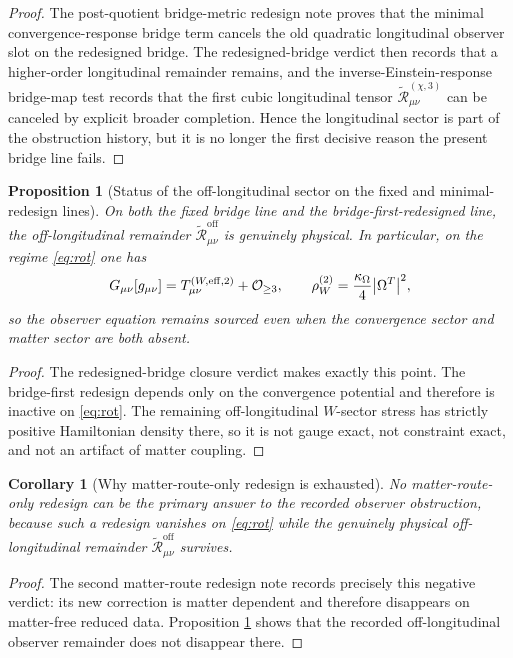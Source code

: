 \documentclass[11pt]{article}
\newcommand{\ObserverMetric}{g_{\mu\nu}}
\newcommand{\RemOff}{\widetilde{\mathcal R}_{\mu\nu}^{\mathrm{off}}}
\newcommand{\RemLongThree}{\widetilde{\mathcal R}_{\mu\nu}^{(\chi,3)}}
\newtheorem{proposition}{Proposition}
\newtheorem{corollary}{Corollary}
\begin{document}
\begin{proof}
The post-quotient bridge-metric redesign note proves that the minimal convergence-response bridge term cancels the old quadratic longitudinal observer slot on the redesigned bridge. The redesigned-bridge verdict then records that a higher-order longitudinal remainder remains, and the inverse-Einstein-response bridge-map test records that the first cubic longitudinal tensor \(\RemLongThree\) can be canceled by explicit broader completion. Hence the longitudinal sector is part of the obstruction history, but it is no longer the first decisive reason the present bridge line fails.
\end{proof}

\begin{proposition}[Status of the off-longitudinal sector on the fixed and minimal-redesign lines]
\label{prop:off}
On both the fixed bridge line and the bridge-first-redesigned line, the off-longitudinal remainder \(\RemOff\) is genuinely physical. In particular, on the regime \eqref{eq:rot} one has
\begin{equation}
G_{\mu\nu}[\ObserverMetric]
=
T_{\mu\nu}^{(W,\mathrm{eff},2)}
+ \mathcal O_{\ge 3},
\qquad
\rho_W^{(2)}
=
\frac{\kappa_\Omega}{4}\abs{\Omega^T}^2,
\label{eq:off}
\end{equation}
so the observer equation remains sourced even when the convergence sector and matter sector are both absent.
\end{proposition}

\begin{proof}
The redesigned-bridge closure verdict makes exactly this point. The bridge-first redesign depends only on the convergence potential and therefore is inactive on \eqref{eq:rot}. The remaining off-longitudinal \(W\)-sector stress has strictly positive Hamiltonian density there, so it is not gauge exact, not constraint exact, and not an artifact of matter coupling.
\end{proof}

\begin{corollary}[Why matter-route-only redesign is exhausted]
\label{cor:matter}
No matter-route-only redesign can be the primary answer to the recorded observer obstruction, because such a redesign vanishes on \eqref{eq:rot} while the genuinely physical off-longitudinal remainder \(\RemOff\) survives.
\end{corollary}

\begin{proof}
The second matter-route redesign note records precisely this negative verdict: its new correction is matter dependent and therefore disappears on matter-free reduced data. Proposition \ref{prop:off} shows that the recorded off-longitudinal observer remainder does not disappear there.
\end{proof}
\end{document}
